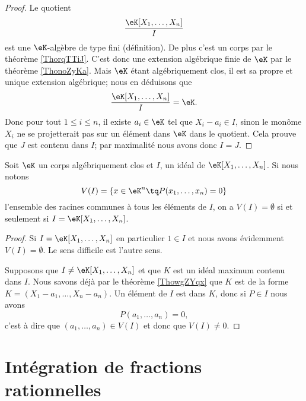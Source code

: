 \begin{proof}
    Le quotient
    \begin{equation}
        \frac{ \eK[X_1,\ldots, X_n] }{ I }
    \end{equation}
    est une \( \eK\)-algèbre de type fini (définition). De plus c'est un corps par le théorème \ref{ThorqTTiJ}. C'est donc une extension algébrique finie de \( \eK\) par le théorème \ref{ThonoZyKa}. Mais \( \eK\) étant algébriquement clos, il est sa propre et unique extension algébrique; nous en déduisons que
    \begin{equation}
        \frac{ \eK[X_1,\ldots, X_n] }{ I }=\eK.
    \end{equation}
    Donc pour tout \( 1\leq i\leq n\), il existe \( a_i\in \eK\) tel que \( X_i-a_i\in I\), sinon le monôme \( X_i\) ne se projetterait pas sur un élément dans \( \eK\) dans le quotient. Cela prouve que \( J\) est contenu dans \( I\); par maximalité nous avons donc \( I=J\).
\end{proof}

\begin{corollary}
    Soit \( \eK\) un corps algébriquement clos et \( I\), un idéal de \( \eK[X_1,\ldots, X_n]\). Si nous notons
    \begin{equation}
        V(I)=\{ x\in \eK^n\tq P(x_1,\ldots, x_n)=0 \}
    \end{equation}
    l'ensemble des racines communes à tous les éléments de \( I\), on a \( V(I)=\emptyset\) si et seulement si \( I=\eK[X_1,\ldots, X_n]\).
\end{corollary}

\begin{proof}
    Si \( I=\eK[X_1,\ldots, X_n]\) en particulier \( 1\in I\) et nous avons évidemment \( V(I)=\emptyset\). Le sens difficile est l'autre sens.

    Supposons que \( I\neq \eK[X_1,\ldots, X_n]\) et que \( K\) est un idéal maximum contenu dans \( I\). Nous savons déjà par le théorème \ref{ThowgZYqx} que \( K\) est de la forme \( K=(X_1-a_1,\ldots, X_n-a_n)\). Un élément de \( I\) est dans \( K\), donc si \( P\in I\) nous avons
    \begin{equation}
        P(a_1,\ldots, a_n)=0,
    \end{equation}
    c'est à dire que \( (a_1,\ldots, a_n)\in V(I)\) et donc que \( V(I)\neq 0\).
\end{proof}

\section{Intégration de fractions rationnelles}

